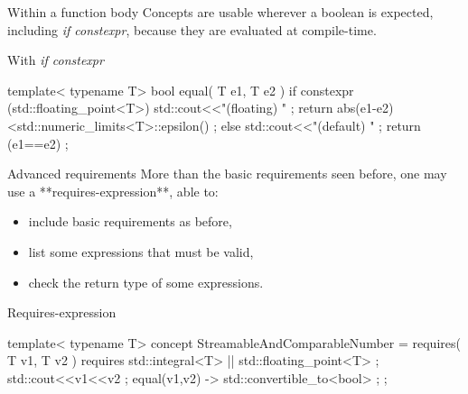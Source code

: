   \begin{frame}[fragile]
    \begin{block}{Within a function body}
    Concepts are usable wherever a boolean is expected, including {\it if constexpr}, because they are evaluated at compile-time.
    \end{block}
    \begin{exampleblock}{With {\it if constexpr}}
      \begin{cppcode*}{}
      template< typename T>
      bool equal( T e1, T e2 )
      {
        if constexpr (std::floating_point<T>)
        {
          std::cout<<"(floating) " ;
          return abs(e1-e2)<std::numeric_limits<T>::epsilon() ;
        }
        else
        {
          std::cout<<"(default) " ;
          return (e1==e2) ;
        }
      }
      \end{cppcode*}
    \end{exampleblock}
  \end{frame}

  \begin{frame}[fragile]
    \begin{block}{Advanced requirements}
        More than the basic requirements seen before, one may use a **requires-expression**, able to:
        \begin{itemize}
            \item include basic requirements as before,
            \item list some expressions that must be valid,
            \item check the return type of some expressions.
        \end{itemize}
    \end{block}
    \begin{exampleblock}{Requires-expression}
      \begin{cppcode*}{}
      template< typename T>
      concept StreamableAndComparableNumber = requires( T v1, T v2 )
       {
        requires std::integral<T> || std::floating_point<T> ;
        std::cout<<v1<<v2 ;
        { equal(v1,v2) } -> std::convertible_to<bool> ;
       } ;
      \end{cppcode*}
    \end{exampleblock}
  \end{frame}
